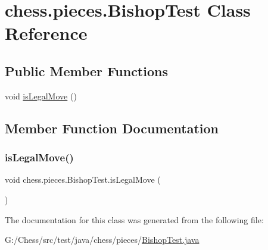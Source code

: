 \hypertarget{classchess_1_1pieces_1_1_bishop_test}{}\section{chess.\+pieces.\+Bishop\+Test Class Reference}
\label{classchess_1_1pieces_1_1_bishop_test}
\subsection*{Public Member Functions}
\begin{DoxyCompactItemize}
\item 
void \mbox{\hyperlink{classchess_1_1pieces_1_1_bishop_test_a8b44eac389e7ab4093c7ecb083c933b1}{is\+Legal\+Move}} ()
\end{DoxyCompactItemize}


\subsection{Member Function Documentation}
\mbox{\label{classchess_1_1pieces_1_1_bishop_test_a8b44eac389e7ab4093c7ecb083c933b1}} 
\subsubsection{\texorpdfstring{is\+Legal\+Move()}{isLegalMove()}}
{\footnotesize\ttfamily void chess.\+pieces.\+Bishop\+Test.\+is\+Legal\+Move (\begin{DoxyParamCaption}{ }\end{DoxyParamCaption})}



The documentation for this class was generated from the following file\+:\begin{DoxyCompactItemize}
\item 
G\+:/\+Chess/src/test/java/chess/pieces/\mbox{\hyperlink{_bishop_test_8java}{Bishop\+Test.\+java}}\end{DoxyCompactItemize}
